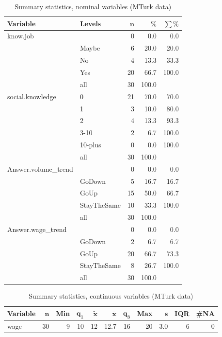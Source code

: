\documentclass[a4paper,10pt]{article}\usepackage[]{graphicx}\usepackage[]{color}
\begin{document}
\begin{table}[ht]
\centering
{\footnotesize
\begin{tabular}{ll|rrr}
 \textbf{Variable} & \textbf{Levels} & $\mathbf{n}$ & $\mathbf{\%}$ & $\mathbf{\sum \%}$ \\ 
  \hline
know.job &  & 0 & 0.0 & 0.0 \\ 
   & Maybe & 6 & 20.0 & 20.0 \\ 
   & No & 4 & 13.3 & 33.3 \\ 
   & Yes & 20 & 66.7 & 100.0 \\ 
   \hline
 & all & 30 & 100.0 &  \\ 
   \hline
\hline
social.knowledge & 0 & 21 & 70.0 & 70.0 \\ 
   & 1 & 3 & 10.0 & 80.0 \\ 
   & 2 & 4 & 13.3 & 93.3 \\ 
   & 3-10 & 2 & 6.7 & 100.0 \\ 
   & 10-plus & 0 & 0.0 & 100.0 \\ 
   \hline
 & all & 30 & 100.0 &  \\ 
   \hline
\hline
Answer.volume\_trend &  & 0 & 0.0 & 0.0 \\ 
   & GoDown & 5 & 16.7 & 16.7 \\ 
   & GoUp & 15 & 50.0 & 66.7 \\ 
   & StayTheSame & 10 & 33.3 & 100.0 \\ 
   \hline
 & all & 30 & 100.0 &  \\ 
   \hline
\hline
Answer.wage\_trend &  & 0 & 0.0 & 0.0 \\ 
   & GoDown & 2 & 6.7 & 6.7 \\ 
   & GoUp & 20 & 66.7 & 73.3 \\ 
   & StayTheSame & 8 & 26.7 & 100.0 \\ 
   \hline
 & all & 30 & 100.0 &  \\ 
   \hline
\hline
\end{tabular}
}
\caption{Summary statistics, nominal variables (MTurk data)} 
\label{tab1:39-9030}
\end{table}
\begin{table}[ht]
\centering
{\footnotesize
\begin{tabular}{lrrrrrrrrrr}
 \textbf{Variable} & $\mathbf{n}$ & \textbf{Min} & $\mathbf{q_1}$ & $\mathbf{\widetilde{x}}$ & $\mathbf{\bar{x}}$ & $\mathbf{q_3}$ & \textbf{Max} & $\mathbf{s}$ & \textbf{IQR} & \textbf{\#NA} \\ 
  \hline
wage & 30 & 9 & 10 & 12 & 12.7 & 16 & 20 & 3.0 & 6 & 0 \\ 
  \end{tabular}
}
\caption{Summary statistics, continuous variables (MTurk data)} 
\label{tab2:39-9030}
\end{table}
\end{document}
